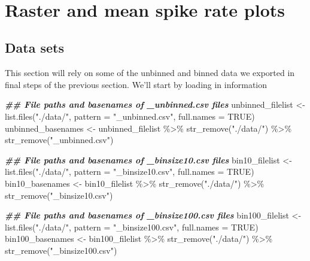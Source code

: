 \documentclass[
]{book}
\newenvironment{Shaded}{\begin{snugshade}}{\end{snugshade}}
\newcommand{\AttributeTok}[1]{\textcolor[rgb]{0.77,0.63,0.00}{#1}}
\newcommand{\ConstantTok}[1]{\textcolor[rgb]{0.00,0.00,0.00}{#1}}
\newcommand{\DocumentationTok}[1]{\textcolor[rgb]{0.56,0.35,0.01}{\textbf{\textit{#1}}}}
\newcommand{\FunctionTok}[1]{\textcolor[rgb]{0.00,0.00,0.00}{#1}}
\newcommand{\NormalTok}[1]{#1}
\newcommand{\OtherTok}[1]{\textcolor[rgb]{0.56,0.35,0.01}{#1}}
\newcommand{\SpecialCharTok}[1]{\textcolor[rgb]{0.00,0.00,0.00}{#1}}
\newcommand{\StringTok}[1]{\textcolor[rgb]{0.31,0.60,0.02}{#1}}
\begin{document}
🐢

\hypertarget{raster-and-mean-spike-rate-plots}{%
\chapter{Raster and mean spike rate plots}\label{raster-and-mean-spike-rate-plots}}

\hypertarget{data-sets}{%
\section{Data sets}\label{data-sets}}

This section will rely on some of the unbinned and binned data we
exported in final steps of the previous section. We'll start by
loading in information

\begin{Shaded}
\begin{Highlighting}[]
\DocumentationTok{\#\# File paths and basenames of \_unbinned.csv files}
\NormalTok{unbinned\_filelist }\OtherTok{\textless{}{-}}
  \FunctionTok{list.files}\NormalTok{(}\StringTok{"./data/"}\NormalTok{, }\AttributeTok{pattern =} \StringTok{"\_unbinned.csv"}\NormalTok{,}
             \AttributeTok{full.names =} \ConstantTok{TRUE}\NormalTok{)}
\NormalTok{unbinned\_basenames }\OtherTok{\textless{}{-}}
\NormalTok{  unbinned\_filelist }\SpecialCharTok{\%\textgreater{}\%}
  \FunctionTok{str\_remove}\NormalTok{(}\StringTok{"./data/"}\NormalTok{) }\SpecialCharTok{\%\textgreater{}\%}
  \FunctionTok{str\_remove}\NormalTok{(}\StringTok{"\_unbinned.csv"}\NormalTok{)}

\DocumentationTok{\#\# File paths and basenames of \_binsize10.csv files}
\NormalTok{bin10\_filelist }\OtherTok{\textless{}{-}}
  \FunctionTok{list.files}\NormalTok{(}\StringTok{"./data/"}\NormalTok{, }\AttributeTok{pattern =} \StringTok{"\_binsize10.csv"}\NormalTok{,}
             \AttributeTok{full.names =} \ConstantTok{TRUE}\NormalTok{)}
\NormalTok{bin10\_basenames }\OtherTok{\textless{}{-}}
\NormalTok{  bin10\_filelist }\SpecialCharTok{\%\textgreater{}\%}
  \FunctionTok{str\_remove}\NormalTok{(}\StringTok{"./data/"}\NormalTok{) }\SpecialCharTok{\%\textgreater{}\%}
  \FunctionTok{str\_remove}\NormalTok{(}\StringTok{"\_binsize10.csv"}\NormalTok{)}

\DocumentationTok{\#\# File paths and basenames of \_binsize100.csv files}
\NormalTok{bin100\_filelist }\OtherTok{\textless{}{-}}
  \FunctionTok{list.files}\NormalTok{(}\StringTok{"./data/"}\NormalTok{, }\AttributeTok{pattern =} \StringTok{"\_binsize100.csv"}\NormalTok{,}
             \AttributeTok{full.names =} \ConstantTok{TRUE}\NormalTok{)}
\NormalTok{bin100\_basenames }\OtherTok{\textless{}{-}}
\NormalTok{  bin100\_filelist }\SpecialCharTok{\%\textgreater{}\%}
  \FunctionTok{str\_remove}\NormalTok{(}\StringTok{"./data/"}\NormalTok{) }\SpecialCharTok{\%\textgreater{}\%}
  \FunctionTok{str\_remove}\NormalTok{(}\StringTok{"\_binsize100.csv"}\NormalTok{)}
\end{Highlighting}
\end{Shaded}
\end{document}
